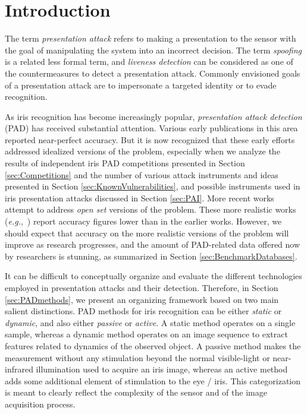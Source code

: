 \documentclass[format=acmsmall, review=false, timestamp=false]{acmart}
\newcommand{\eg}{{\it e.g.},~}
\begin{document}
\maketitle


\section{Introduction}
\label{sec:Introduction}

{The} term {\em presentation attack} refers to making a presentation to the sensor with the goal of manipulating the system into an incorrect decision. The term {\em spoofing} is a related less formal term, and {\em liveness detection} can be considered as one of the countermeasures to detect a presentation attack. Commonly envisioned goals of a presentation attack are to impersonate a targeted identity or to evade recognition.

As iris recognition has become increasingly popular, {\em presentation attack detection} (PAD) has received substantial attention. Various early publications in this area reported near-perfect accuracy. But it is now recognized that these early efforts addressed idealized versions of the problem, especially when we analyze the results of independent iris PAD competitions presented in Section \ref{sec:Competitions} and the number of various attack instruments and ideas presented in Section \ref{sec:KnownVulnerabilities}, and possible instruments used in iris presentation attacks discussed in Section \ref{sec:PAI}. More recent works attempt to address {\em open set} versions of the problem. {T}hese more realistic works  (\eg {\cite{Sequeira_TSP_2016,Yambay_IJCB_2017,Raja_BIOSIG_2016,Sollinger_IET_2017}}) report accuracy figures lower than in the earlier works. However, we should expect that accuracy on the more realistic versions of the problem will improve as research progresses, and the amount of PAD-related data offered now by researchers is stunning, as summarized in Section \ref{sec:BenchmarkDatabases}.

It can be difficult to conceptually organize and evaluate the different technologies employed in presentation attacks and their detection. Therefore, in Section \ref{sec:PADmethods}, we present an organizing framework based on two main salient distinctions. PAD methods for iris recognition can be either {\it static} or {\it dynamic}, and also either {\it passive} or {\it active}.
A static method operates on a single sample, whereas a dynamic method operates on an image sequence to extract features related to dynamics of the observed object. A passive method makes the measurement without any stimulation beyond the normal visible-light or near-infrared illumination used to acquire an iris image, whereas an active method adds some additional element of stimulation to the eye / iris. This categorization is meant to clearly reflect the complexity of the sensor and of the image acquisition process. 
\end{document}
